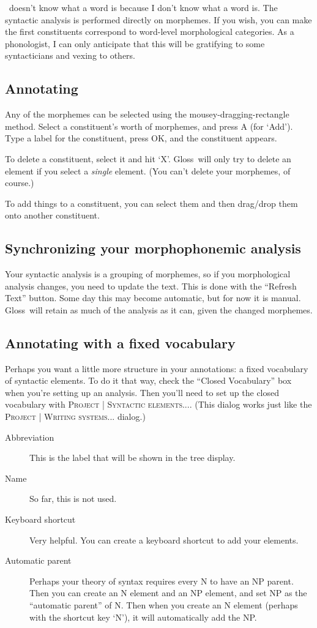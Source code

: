 \documentclass[oneside]{book}
\def\menu#1{\textsc{#1}}
\def\menu#1#2{\textsc{#1 | #2}}
\def\gloss{\textsf{Gloss}}
\def\tip#1\par{\medskip\noindent\fcolorbox{black}{light-gray}{\parbox{\textwidth}{#1}}\par\medskip}
\begin{document}
\tip \gloss\ doesn't know what a word is because I don't know what a word is. The syntactic analysis is performed directly on morphemes. If you wish, you can make the first constituents correspond to word-level morphological categories. As a phonologist, I can only anticipate that this will be gratifying to some syntacticians and vexing to others.

\subsection{Annotating}
Any of the morphemes can be selected using the mousey-dragging-rectangle method. Select a constituent's worth of morphemes, and press A (for `Add'). Type a label for the constituent, press OK, and the constituent appears.

To delete a constituent, select it and hit `X'. \gloss\ will only try to delete an element if you select a \emph{single} element. (You can't delete your morphemes, of course.)

To add things to a constituent, you can select them and then drag/drop them onto another constituent.

\subsection{Synchronizing your morphophonemic analysis}
Your syntactic analysis is a grouping of morphemes, so if you morphological analysis changes, you need to update the text. This is done with the ``Refresh Text'' button. Some day this may become automatic, but for now it is manual. \gloss\ will retain as much of the analysis as it can, given the changed morphemes.

\subsection{Annotating with a fixed vocabulary}
Perhaps you want a little more structure in your annotations: a fixed vocabulary of syntactic elements. To do it that way, check the ``Closed Vocabulary'' box when you're setting up an analysis. Then you'll need to set up the closed vocabulary with \menu{Project}{Syntactic elements...}. (This dialog works just like the \menu{Project}{Writing systems...} dialog.)

\begin{description}
\item[Abbreviation] This is the label that will be shown in the tree display.
\item[Name] So far, this is not used.
\item[Keyboard shortcut] Very helpful. You can create a keyboard shortcut to add your elements.
\item[Automatic parent] Perhaps your theory of syntax requires every N to have an NP parent. Then you can create an N element and an NP element, and set NP as the ``automatic parent'' of N. Then when you create an N element (perhaps with the shortcut key `N'), it will automatically add the NP. 
\end{description}
\end{document}
